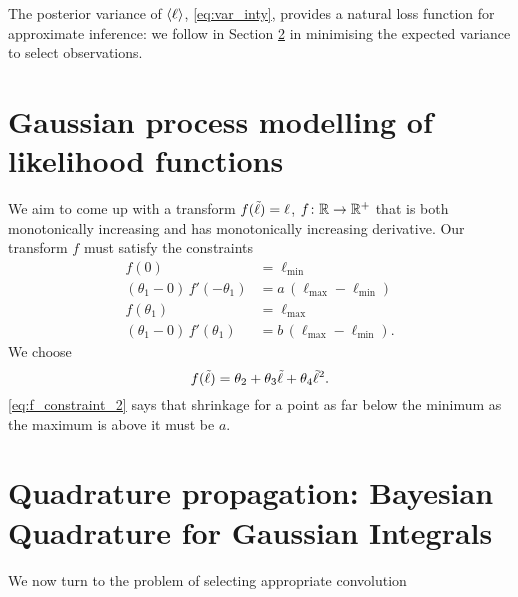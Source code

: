 \documentclass[twoside]{article}
\begin{document}
The posterior variance of $\langle \ell \rangle$, \eqref{eq:var_inty}, provides a natural loss function for approximate inference: we follow \citet{osborne2012active} in Section \ref{sec:active} in minimising the expected variance to select observations. 

\section{Gaussian process modelling of likelihood functions}
We aim to come up with a transform $f({\tilde{\ell}}) = \ell$, $f\colon \mathbb{R} \to \mathbb{R}^+$ that is both monotonically increasing and has monotonically increasing derivative. 
Our transform $f$ must satisfy the constraints
\begin{align}
 f(0) & = \ell_\text{min} \label{eq:f_constraint_1}\\
 (\theta_1 - 0)\, f'(-\theta_1) & = a\,(\ell_\text{max} - \ell_\text{min}) \label{eq:f_constraint_2}\\
 f(\theta_1) & = \ell_\text{max} 
\label{eq:f_constraint_3}\\
 (\theta_1 - 0)\, f'(\theta_1) & = b\,(\ell_\text{max} - \ell_\text{min}). 
\label{eq:f_constraint_4}
\end{align}
We choose
\begin{equation}
 f({\tilde{\ell}}) = \theta_2 + \theta_3 {\tilde{\ell}} + \theta_4 {\tilde{\ell}}^2.
\end{equation}
\eqref{eq:f_constraint_2} says that shrinkage for a point as far below the minimum as the maximum is above it must be $a$.



\begin{figure*}
\caption{}
\end{figure*}


\section{Quadrature propagation: Bayesian Quadrature for Gaussian Integrals}
\label{sec:active}

We now turn to the problem of selecting appropriate convolution 



\end{document}
